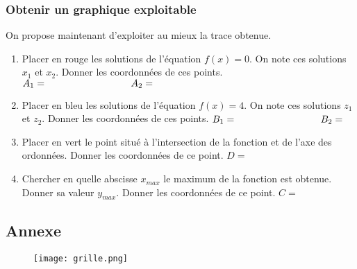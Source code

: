 \documentclass[paper=a4, fontsize=9pt]{scrartcl} %
\begin{document}
\subsubsection*{Obtenir un graphique exploitable}

On propose maintenant d'exploiter au mieux la trace obtenue.

\begin{enumerate}
\item Placer en rouge les solutions de l'équation $f(x) = 0$. On note ces solutions $x_1$ et $x_2$. Donner les coordonnées de ces points. $A_1 = \text{\phantom{azertyuipazertyuiop}} A_2 =$
\item Placer en bleu les solutions de l'équation $f(x) = 4$. On note ces solutions $z_1$ et $z_2$. Donner les coordonnées de ces points. $B_1 = \text{\phantom{azertyuipazertyuiop}} B_2 =$
\item Placer en vert le point situé à l'intersection de la fonction et de l'axe des ordonnées. Donner les coordonnées de ce point. $D = $
\item Chercher en quelle abscisse $x_{max}$ le maximum de la fonction est obtenue. Donner sa valeur $y_{max}$. Donner les coordonnées de ce point. $C = $
\end{enumerate}


\subsection*{Annexe}

\begin{figure}[H]
  \centering
  \texttt{[image: grille.png]}
\end{figure}
\end{document}

